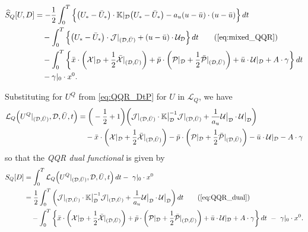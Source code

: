 \documentclass[11pt]{article}
\newcommand{\K}{\mathbb{K}}
\newcommand{\half}{\frac{1}{2}}
\newcommand{\calP}{{\cal P}}
\newcommand{\calU}{{\cal U}}
\newcommand{\calX}{{\cal X}}
\newcommand{\dee}{\mathcal{D}}
\newcommand{\scl}{\mathcal{L}}
\begin{document}
 \begin{subequations}\label{eq:mixed_QQR}
 \allowdisplaybreaks
 \begin{align}
      \widehat{S}_Q[U,D] & = - \half \int_0^T \Big\{ \big( U_* - \bar{U}_* \big) \cdot \K|_\dee \big( U_* - \bar{U}_* \big) - a_u (u - \bar{u})\cdot (u - \bar{u}) \Big\} \, dt\notag\\
      & \quad - \int_0^T \Big\{ \big( U_* - \bar{U}_* \big) \cdot \mathcal{J}|_{(\dee,\bar{U})} + (u - \bar{u}) \cdot \mathcal{U}_\dee \Big\} \, dt \tag{\ref{eq:mixed_QQR}}\\
      & \quad - \int_0^T \bigg\{ \bar{x} \cdot \left( \calX |_\dee + \half \bar{\calX}|_{(\dee, \bar{U})} \right) + \bar{p} \cdot \left( \calP |_\dee + \half \bar{\calP}|_{(\dee, \bar{U})} \right) + \bar{u} \cdot \calU |_\dee + A \cdot \gamma \bigg\} \, dt \notag\\
      & \quad - \gamma|_0 \cdot x^0. \notag
 \end{align}
 \end{subequations}

 Substituting for $U^Q$ from \eqref{eq:QQR_DtP} for $U$ in $\scl_Q$, we have
\begin{equation*}
    \allowdisplaybreaks
    \begin{aligned}
        \scl_Q \Big(U^Q|_{(\dee,\bar{U})},\dee, \bar{U}, t \Big) & = \bigg(- \half + 1 \bigg) \bigg( \mathcal{J}|_{(\dee,\bar{U})} \cdot \K \big|_\dee^{-1} \mathcal{J}|_{(\dee,\bar{U})} + \frac{1}{a_u} \calU \big|_\dee \cdot \calU \big|_\dee \bigg) \notag\\
        & \quad - \bar{x} \cdot \left( \calX |_\dee + \half \bar{\calX}|_{(\dee, \bar{U})} \right) - \bar{p} \cdot \left( \calP |_\dee + \half \bar{\calP}|_{(\dee, \bar{U})} \right) - \bar{u} \cdot \calU |_\dee - A \cdot \gamma
    \end{aligned}
\end{equation*}
so that the \emph{QQR dual functional} is given by
\begin{subequations}
    \label{eq:QQR_dual}
    \begin{align}
        S_Q[D] & = \int_0^T \scl_Q \Big(U^Q|_{(\dee,\bar{U})},\dee, \bar{U}, t \Big) \, dt - \ \gamma|_0 \cdot x^0 \notag\\
        & = \half \int_0^T \bigg( \mathcal{J}|_{(\dee,\bar{U})} \cdot \K \big|_\dee^{-1} \mathcal{J}|_{(\dee,\bar{U})} + \frac{1}{a_u} \calU \big|_\dee \cdot \calU \big|_\dee \bigg) \, dt \tag{\ref{eq:QQR_dual}}\\
        & \quad - \int_0^T \bigg\{ \bar{x} \cdot \left( \calX |_\dee + \half \bar{\calX}|_{(\dee, \bar{U})} \right) + \bar{p} \cdot \left( \calP |_\dee + \half \bar{\calP}|_{(\dee, \bar{U})} \right) + \bar{u} \cdot \calU |_\dee + A \cdot \gamma \bigg\} \, dt \ - \  \gamma|_0 \cdot x^0. \notag
    \end{align}
\end{subequations}
\end{document}
